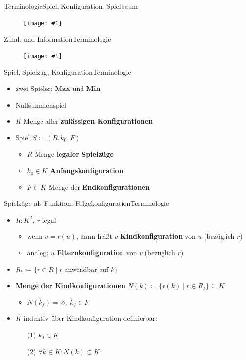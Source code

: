 \documentclass[18pt, aspectratio=169, handout]{beamer}
\let\emptyset\varnothing
\newcommand\g[3]{%
  \begin{figure}[!ht]
  \centering
  \texttt{[image: \#1]}
  {\small#3}
  \end{figure}}
\newcommand\gw[2]{%
  \begin{figure}[!ht]
  \centering
  \texttt{[image: \#1]}
  {\small#2}
  \end{figure}}
\begin{document}

\begin{frame}{Terminologie}{Spiel, Konfiguration, Spielbaum}
  \gw{a/agenda_diagram_Term.pdf}{}
\end{frame}

\begin{frame}{Zufall und Information}{Terminologie}
	\g{img/spiel.pdf}{0.65}{}
\end{frame}

\begin{frame}{Spiel, Spielzug, Konfiguration}{Terminologie}
	\begin{itemize}
		\item zwei Spieler: \textbf{Max} und \textbf{Min}
		\pause
		\item Nullsummenspiel
		\pause
		\item $K$ \quad Menge aller \textbf{zulässigen Konfigurationen}
		\pause
		\item Spiel $S \coloneqq (R,k_0,F)$
		\begin{itemize}
			\pause
			\item $R$ \quad Menge \textbf{legaler Spielzüge}
			\pause
			\item $k_0 \in K$ \quad \textbf{Anfangskonfiguration}
			\pause
			\item $F \subset K$ \quad Menge der \textbf{Endkonfigurationen}
		\end{itemize}
	\end{itemize}	
\end{frame}

\begin{frame}{Spielzüge als Funktion, Folgekonfiguration}{Terminologie}
	\begin{itemize}
		\item $R:K^2,~r$ legal
		\pause
		\begin{itemize}
			\item wenn $v = r(u)$, dann heißt $v$ \textbf{Kindkonfiguration} von $u$ (bezüglich $r$)
			\item analog: $u$ \textbf{Elternkonfiguration} von $v$ (bezüglich $r$)
		\end{itemize}
		\pause
		\item $R_k \coloneqq \{r \in R \mid r$ anwendbar auf $k\}$
		\pause
		\item \textbf{Menge der Kindkonfigurationen} $N(k) \coloneqq \{r(k) \mid r \in R_k\} \subseteq K$
		\pause
		\begin{itemize}
			\item $N(k_f) = \emptyset,~k_f \in F$
		\end{itemize}
		\pause
		\item $K$ induktiv über Kindkonfiguration definierbar:
		\pause
		\begin{itemize}
			\item[(1)] $k_0 \in K$
			\item[(2)] $\forall k \in K: N(k) \subset K$
		\end{itemize}
	\end{itemize}
\end{frame}
\end{document}
